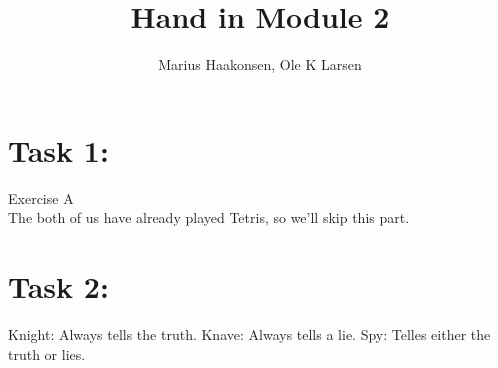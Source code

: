 \documentclass[11pt]{amsart}
\title{Hand in Module 2}
\author{Marius Haakonsen, Ole K Larsen}
\begin{document}
\maketitle

\section{Task 1:}

Exercise A  \\
The both of us have already played Tetris, so we'll skip this part.  \\





\section{Task 2:}

Knight: Always tells the truth.
Knave: Always tells a lie.
Spy: Telles either the truth or lies.
\end{document}

